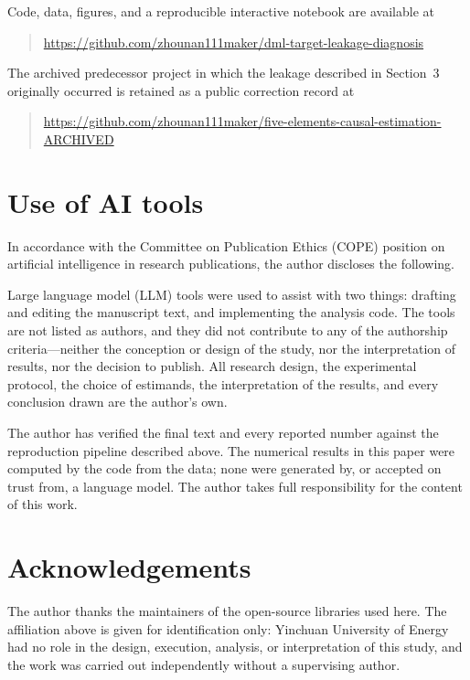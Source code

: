 \documentclass[11pt]{article}
\begin{document}
Code, data, figures, and a reproducible interactive notebook are available at

\begin{quote}
\url{https://github.com/zhounan111maker/dml-target-leakage-diagnosis}
\end{quote}

The archived predecessor project in which the leakage described in Section~3 originally occurred is retained as a public correction record at

\begin{quote}
\url{https://github.com/zhounan111maker/five-elements-causal-estimation-ARCHIVED}
\end{quote}

\section*{Use of AI tools}

In accordance with the Committee on Publication Ethics (COPE) position on artificial intelligence in research publications, the author discloses the following.

Large language model (LLM) tools were used to assist with two things: drafting and editing the manuscript text, and implementing the analysis code. The tools are not listed as authors, and they did not contribute to any of the authorship criteria---neither the conception or design of the study, nor the interpretation of results, nor the decision to publish. All research design, the experimental protocol, the choice of estimands, the interpretation of the results, and every conclusion drawn are the author's own.

The author has verified the final text and every reported number against the reproduction pipeline described above. The numerical results in this paper were computed by the code from the data; none were generated by, or accepted on trust from, a language model. The author takes full responsibility for the content of this work.

\section*{Acknowledgements}
The author thanks the maintainers of the open-source libraries used here. The affiliation above is given for identification only: Yinchuan University of Energy had no role in the design, execution, analysis, or interpretation of this study, and the work was carried out independently without a supervising author.
\end{document}
